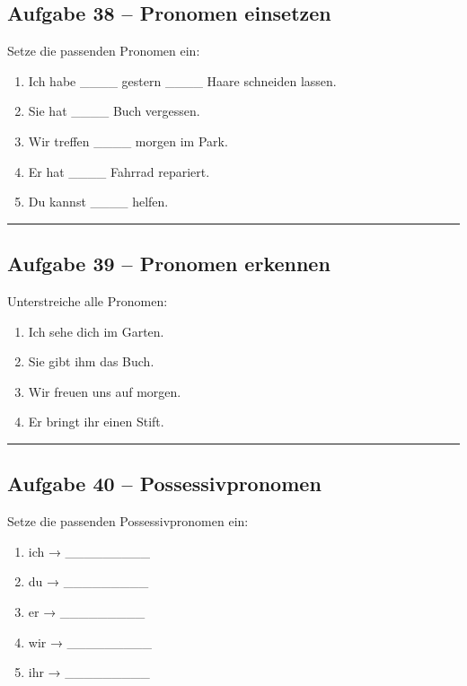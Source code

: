 \documentclass[a4paper,12pt]{article}
\newcommand{\linie}{\vspace{4pt}\hrule\vspace{10pt}}
\begin{document}
\subsection*{Aufgabe 38 – Pronomen einsetzen}

Setze die passenden Pronomen ein:

\begin{enumerate}
\item Ich habe \_\_\_\_ gestern \_\_\_\_ Haare schneiden lassen.
\item Sie hat \_\_\_\_ Buch vergessen.
\item Wir treffen \_\_\_\_ morgen im Park.
\item Er hat \_\_\_\_ Fahrrad repariert.
\item Du kannst \_\_\_\_ helfen.
\end{enumerate}

\linie

\subsection*{Aufgabe 39 – Pronomen erkennen}

Unterstreiche alle Pronomen:

\begin{enumerate}
\item Ich sehe dich im Garten.
\item Sie gibt ihm das Buch.
\item Wir freuen uns auf morgen.
\item Er bringt ihr einen Stift.
\end{enumerate}

\linie

\subsection*{Aufgabe 40 – Possessivpronomen}

Setze die passenden Possessivpronomen ein:

\begin{enumerate}
\item ich → \_\_\_\_\_\_\_\_\_
\item du → \_\_\_\_\_\_\_\_\_
\item er → \_\_\_\_\_\_\_\_\_
\item wir → \_\_\_\_\_\_\_\_\_
\item ihr → \_\_\_\_\_\_\_\_\_
\end{enumerate}
\end{document}
